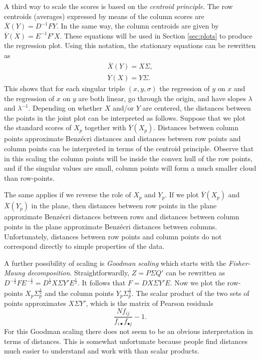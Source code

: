 \documentclass[article]{Z}
\begin{document}
A third way to scale the scores is based on the \emph{centroid principle}. The row centroids (averages) expressed by means of the column scores are \(\overline{X}(Y)=D^{-1}FY\). In the same way, the column centroids are given by
\(\overline{Y}(X)=E^{-1}F'X\). These equations will be used in Section \ref{sec:plots} to produce the regression plot. Using this notation, the stationary equations can be
rewritten as
\begin{subequations}
\label{E:cent}
\begin{align}
\overline{X}(Y)=X\Sigma,\\
\overline{Y}(X)=Y\Sigma.
\end{align}
\end{subequations}
This shows that for each singular triple \((x,y,\sigma)\) the regression of \(y\) on
\(x\) and the regression of \(x\) on \(y\) are both linear, go through the origin, and have
slopes \(\lambda\) and \(\lambda^{-1}\). Depending on whether $X$ and/or $Y$ are centered, the distances between the points in the joint plot can be interpreted as follows. Suppose that we plot the standard scores of \(X_p\) together with $\overline{Y}(X_p)$. Distances between column points approximate Benz\'ecri distances and distances between row points and column points can be interpreted in terms of the centroid principle. Observe that in this scaling the column points will be inside the convex hull of the row points, and if the singular values are small, column points will form a much smaller cloud than row-points. 

The same applies if we reverse the role of \(X_p\) and \(Y_p\). If we plot $\overline{Y}(X_p)$ and $\overline{X}(Y_p)$ in the plane, then distances between row points in the plane approximate Benz\'ecri distances between rows and distances between column points in the plane approximate Benz\'ecri distances between columns. Unfortunately, distances between row points and column points do not correspond directly to simple properties of the data. 

A further possibility of scaling is \emph{Goodman scaling} which starts with the \emph{Fisher-Maung decomposition}. Straightforwardly, $Z=P\Sigma Q'$ can be rewritten as $D^{-\frac12}FE^{-\frac12}=D^{\frac12}X\Sigma Y'E^{\frac12}$. It follows that $F=DX\Sigma Y'E$. Now we plot the row-points  \(X_p\Sigma_p^{\frac12}\) and the column points \(Y_p\Sigma_p^\frac12\). The scalar product of the two sets of points approximates \(X\Sigma Y'\), which is the matrix of Pearson residuals
\begin{equation}
\frac{Nf_{ij}}{f_{i\bullet}f_{\bullet j}}-1.
\end{equation}
For this Goodman scaling there does not seem to be an obvious interpretation in terms of distances. This is
somewhat unfortunate because people find distances much easier to understand and
work with than scalar products. 
\end{document}
